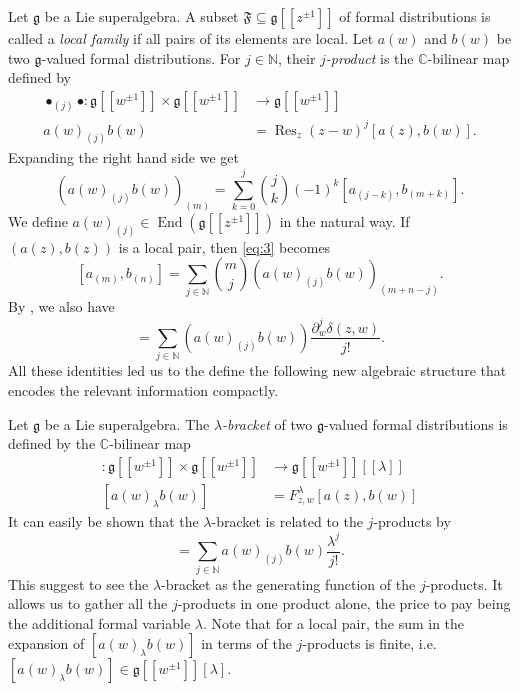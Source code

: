 \documentclass[a4paper, 12pt, reqno]{amsart}
\theoremstyle{remark}
\numberwithin{equation}{subsection}
\DeclareMathOperator{\End}{End}
\DeclareMathOperator{\Res}{Res}
\begin{document}
Let $\mathfrak{g}$ be a Lie superalgebra.
A subset $\mathfrak{F} \subseteq \mathfrak{g}[[z^{\pm 1}]]$ of formal distributions is called a \emph{local family} if all pairs of its elements are local.
Let $a(w)$ and $b(w)$ be two $\mathfrak{g}$-valued formal distributions.
For $j \in \mathbb{N}$, their \emph{$j$-product} is the $\mathbb{C}$-bilinear map defined by
\begin{align}
  \nonumber
  \bullet_{(j)}\bullet: \mathfrak{g}[[w^{\pm 1}]] \times \mathfrak{g}[[w^{\pm 1}]] &\to \mathfrak{g}[[w^{\pm 1}]]\\
  \label{eq:4}
  a(w)_{(j)}b(w) &= \Res_z(z - w)^j[a(z), b(w)].
\end{align}
Expanding the right hand side we get
\begin{equation}
  \label{eq:5}
  (a(w)_{(j)}b(w))_{(m)} = \sum_{k = 0}^j\binom{j}{k}(-1)^k[a_{(j - k)},b_{(m + k)}].
\end{equation}
We define $a(w)_{(j)} \in \End(\mathfrak{g}[[z^{\pm 1}]])$ in the natural way.
If $(a(z), b(z))$ is a local pair, then \eqref{eq:3} becomes
\begin{equation}
  \label{eq:6}
  [a_{(m)}, b_{(n)}] = \sum_{j \in \mathbb{N}}\binom{m}{j}(a(w)_{(j)}b(w))_{(m + n - j)}.
\end{equation}
By , we also have
\begin{equation*}
  [a(z),b(w)]=\sum_{j\in \mathbb{N}}(a(w)_{(j)}b(w))\frac{\partial_w^j\delta(z,w)}{j!}.
\end{equation*}
All these identities led us to the define the following new algebraic structure that encodes the relevant information compactly.

Let $\mathfrak{g}$ be a Lie superalgebra.
The \emph{$\lambda$-bracket} of two $\mathfrak{g}$-valued formal distributions is defined by the $\mathbb{C}$-bilinear map
\begin{align*}
  [\bullet_{\lambda}\bullet]: \mathfrak{g}[[w^{\pm 1}]] \times \mathfrak{g}[[w^{\pm 1}]] &\to \mathfrak{g}[[w^{\pm 1}]][[\lambda]] \\
  [a(w)_{\lambda}b(w)] &= F^{\lambda}_{z, w}[a(z), b(w)]
\end{align*}
It can easily be shown that the $\lambda$-bracket is related to the $j$-products by
\begin{equation*}
  [a(w)_{\lambda}b(w)] = \sum_{j \in \mathbb{N}}a(w)_{(j)}b(w)\frac{\lambda^j}{j!}.
\end{equation*}
This suggest to see the $\lambda$-bracket as the generating function of the $j$-products.
It allows us to gather all the $j$-products in one product alone, the price to pay being the additional formal variable $\lambda$.
Note that for a local pair, the sum in the expansion of $[a(w)_{\lambda} b(w)]$ in terms of the $j$-products is finite, i.e.\ $[a(w)_{\lambda}b(w)] \in \mathfrak{g}[[w^{\pm 1}]][\lambda]$.
\end{document}

